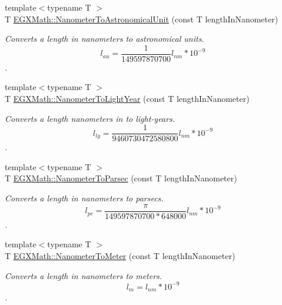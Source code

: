 \begin{DoxyCompactItemize}
\item 
{\footnotesize template$<$typename T $>$ }\\T \mbox{\hyperlink{group___e_g_x_math-_conversions-_length_conversions-_s_i-_nanometer-_astronomical_gab45f259430dc605beef983b095325ce1}{E\+G\+X\+Math\+::\+Nanometer\+To\+Astronomical\+Unit}} (const T length\+In\+Nanometer)
\begin{DoxyCompactList}\small\item\em Converts a length in nanometers to astronomical units. \[ l_{au}= \frac{1}{149597870700} l_{nm} * 10^{-9} \]. \end{DoxyCompactList}\item 
{\footnotesize template$<$typename T $>$ }\\T \mbox{\hyperlink{group___e_g_x_math-_conversions-_length_conversions-_s_i-_nanometer-_astronomical_ga9ef3d82e1ccb8e07dfb52500ff447b17}{E\+G\+X\+Math\+::\+Nanometer\+To\+Light\+Year}} (const T length\+In\+Nanometer)
\begin{DoxyCompactList}\small\item\em Converts a length nanometers in to light-\/years. \[ l_{ly}= \frac{1}{9460730472580800} l_{nm} * 10^{-9} \]. \end{DoxyCompactList}\item 
{\footnotesize template$<$typename T $>$ }\\T \mbox{\hyperlink{group___e_g_x_math-_conversions-_length_conversions-_s_i-_nanometer-_astronomical_ga20e55ba8ac39aaf9b27c4092266cdcee}{E\+G\+X\+Math\+::\+Nanometer\+To\+Parsec}} (const T length\+In\+Nanometer)
\begin{DoxyCompactList}\small\item\em Converts a length in nanometers to parsecs. \[ l_{pc}=\frac{\pi}{149597870700 * 648000} l_{nm} * 10^{-9} \]. \end{DoxyCompactList}\item 
{\footnotesize template$<$typename T $>$ }\\T \mbox{\hyperlink{group___e_g_x_math-_conversions-_length_conversions-_s_i-_nanometer-_s_i_ga2ceddcda2954e4bb6cf1216ce4edc160}{E\+G\+X\+Math\+::\+Nanometer\+To\+Meter}} (const T length\+In\+Nanometer)
\begin{DoxyCompactList}\small\item\em Converts a length in nanometers to meters. \[ l_{m}=l_{nm} * 10^{-9} \]. \end{DoxyCompactList}\item 

\end{DoxyCompactItemize}
